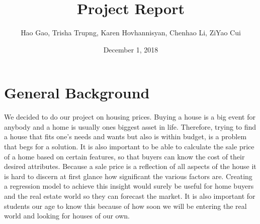 \documentclass{article}
\title{Project Report}
\author{Hao Gao, Trisha Trupng, Karen Hovhannisyan, Chenhao Li, ZiYao Cui}
\date{December 1, 2018}
\begin{document}
\maketitle 
\section*{General Background}
We decided to do our project on housing prices. Buying a house is a big event for anybody and a home is usually ones biggest asset in life. Therefore, trying to find a house that fits one’s needs and wants but also is within budget, is a problem that begs for a solution. It is also important to be able to calculate the sale price of a home based on certain features, so that buyers can know the cost of their desired attributes. Because a sale price is a reflection of all aspects of the house it is hard to discern at first glance how significant the various factors are. Creating a regression model to achieve this insight would surely be useful for home buyers and the real estate world so they can forecast the market. It is also important for students our age to know this because of how soon we will be entering the real world and looking for houses of our own. 
\end{document}
